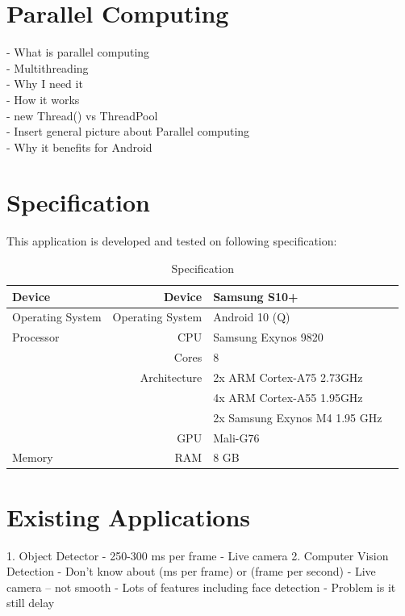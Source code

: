     \section{Parallel Computing}
        -	What is parallel computing \\
        -   Multithreading \\
        -	Why I need it \\
        -	How it works \\
            - new Thread() vs ThreadPool \\
            - Insert general picture about Parallel computing\\
        -	Why it benefits for Android\\


    \section{Specification}
        This application is developed and tested on following specification:

        \begin{table}[!htp]\centering
            \caption{Specification}\label{tab: }
            \scriptsize
            \begin{tabular}{lrll}\toprule
                Device              &Device             &Samsung S10+ \\ \hline
                Operating System    &Operating System   &Android 10 (Q) \\ \hline
                Processor           &CPU                &Samsung Exynos 9820 \\
                                    &Cores              &8 \\
                                    &Architecture       &2x ARM Cortex-A75 2.73GHz \\
                                    &                   &4x ARM Cortex-A55 1.95GHz \\
                                    &                   &2x Samsung Exynos M4 1.95 GHz \\
                                    &GPU                &Mali-G76 \\ \hline
                Memory              &RAM                &8 GB \\
                \bottomrule
            \end{tabular}
        \end{table}


    \section{Existing Applications}
        1.	Object Detector
            -	250-300 ms per frame
            -	Live camera
        2.	Computer Vision Detection
            -	Don’t know about (ms per frame) or (frame per second)
            -	Live camera – not smooth
            -	Lots of features including face detection
            -	Problem is it still delay
